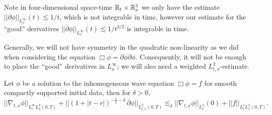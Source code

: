 \begin{remark}
	Note in four-dimensional space-time $\mathbb R_t \times \mathbb R^3_x$ we only have the estimate $||\partial \phi||_{L^\infty_x} (t) \lesssim 1/t$, which is not integrable in time, however our estimate for the ``good'' derivatives $||\overline\partial \phi||_{L^\infty_x} (t) \lesssim 1/t^{3/2}$ is integrable in time.  
\end{remark}

Generally, we will not have symmetry in the quadratic non-linearity as we did when considering the equation $\Box \phi = \partial \phi \partial \phi$. Consequently, it will not be enough to place the ``good'' derivatives in $L^\infty_x$; we will also need a weighted $L^2_{t, x}$-estimate.

\begin{theorem}
	Let $\phi$ be a solution to the inhomogeneous wave equation $\Box \phi = f$ for smooth compactly supported initial data, then for $\delta > 0$,
		\[ || \nabla_{t, x} \phi ||_{L^\infty_t L^2_x (0, T)} + ||(1 + |t - r|)^{-\frac12 - \delta} \, \overline\partial \phi||_{L^2_{t, x}(0, T)} \lesssim_\delta ||\nabla_{t, x} \phi||_{L^2_x} (0) + ||f||_{L^1_t L^2_x (0, T)} . \]
		\label{thm:nullenergy}
\end{theorem}

